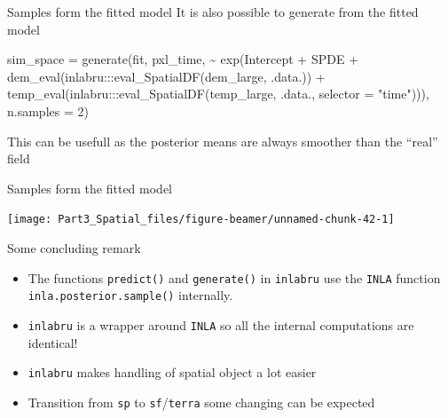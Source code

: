 \documentclass[
  ignorenonframetext,
]{beamer}
\newenvironment{Shaded}{\begin{snugshade}}{\end{snugshade}}
\newcommand{\AttributeTok}[1]{\textcolor[rgb]{0.77,0.63,0.00}{#1}}
\newcommand{\DecValTok}[1]{\textcolor[rgb]{0.00,0.00,0.81}{#1}}
\newcommand{\FunctionTok}[1]{\textcolor[rgb]{0.00,0.00,0.00}{#1}}
\newcommand{\NormalTok}[1]{#1}
\newcommand{\OtherTok}[1]{\textcolor[rgb]{0.56,0.35,0.01}{#1}}
\newcommand{\SpecialCharTok}[1]{\textcolor[rgb]{0.00,0.00,0.00}{#1}}
\newcommand{\StringTok}[1]{\textcolor[rgb]{0.31,0.60,0.02}{#1}}
\begin{document}
\begin{frame}[fragile]{Samples form the fitted model}
\protect\hypertarget{samples-form-the-fitted-model}{}
It is also possible to generate from the fitted model \tiny

\begin{Shaded}
\begin{Highlighting}[]
\NormalTok{sim\_space }\OtherTok{=} \FunctionTok{generate}\NormalTok{(fit, pxl\_time, }
                      \SpecialCharTok{\textasciitilde{}} \FunctionTok{exp}\NormalTok{(Intercept }\SpecialCharTok{+}\NormalTok{ SPDE }\SpecialCharTok{+}
                       \FunctionTok{dem\_eval}\NormalTok{(inlabru}\SpecialCharTok{:::}\FunctionTok{eval\_SpatialDF}\NormalTok{(dem\_large,}
\NormalTok{                                                         .data.)) }\SpecialCharTok{+}
                       \FunctionTok{temp\_eval}\NormalTok{(inlabru}\SpecialCharTok{:::}\FunctionTok{eval\_SpatialDF}\NormalTok{(temp\_large,}
\NormalTok{                                                          .data.,}
                                                          \AttributeTok{selector =} \StringTok{"time"}\NormalTok{))),}
                     \AttributeTok{n.samples =} \DecValTok{2}\NormalTok{)}
\end{Highlighting}
\end{Shaded}

\normalsize

This can be usefull as the posterior means are always smoother than the
``real'' field
\end{frame}

\begin{frame}{Samples form the fitted model}
\protect\hypertarget{samples-form-the-fitted-model-1}{}
\begin{center}\texttt{[image: Part3\_Spatial\_files/figure-beamer/unnamed-chunk-42-1]} \end{center}
\end{frame}

\begin{frame}[fragile]{Some concluding remark}
\protect\hypertarget{some-concluding-remark}{}
\begin{itemize}
\item
  The functions \texttt{predict()} and \texttt{generate()} in
  \texttt{inlabru} use the \texttt{INLA} function
  \texttt{inla.posterior.sample()} internally.
\item
  \texttt{inlabru} is a wrapper around \texttt{INLA} so all the internal
  computations are identical!
\item
  \texttt{inlabru} makes handling of spatial object a lot easier
\item
  Transition from \texttt{sp} to \texttt{sf}/\texttt{terra} some
  changing can be expected
\end{itemize}
\end{frame}
\end{document}
